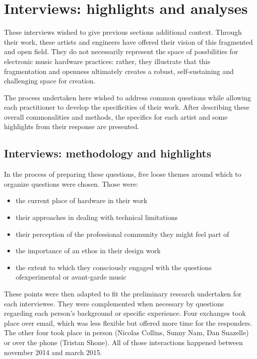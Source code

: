 \chapter{Interviews: highlights and analyses}\label{interviews}

These interviews wished to give previous sections additional context. Through their work, these artists and engineers have offered their vision of this fragmented and open field. They do not necessarily represent the space of possbilities for electronic music hardware practices: rather, they illustrate that this fragmentation and openness ultimately creates a robust, self-sustaining and challenging space for creation. 

The process undertaken here wished to address common questions while allowing each practitioner to develop the specificities of their work. After describing these overall commonalities and methods, the specifics for each artist and some highlights from their response are presented. 

\section{Interviews: methodology and highlights}

In the process of preparing these questions, five loose themes around which to organize questions were chosen. Those were: 

\begin{itemize}
	\item the current place of hardware in their work 
	\item their approaches in dealing with technical limitations
	\item their perception of the professional community they might feel part of
	\item the importance of an ethos in their design work
	\item the extent to which they consciously engaged with the questions ofexperimental or avant-garde music 
	\end{itemize}

These points were then adapted to fit the preliminary research undertaken for each interviewee. They were complemented when necessary by questions regarding each person's background or specific experience. Four exchanges took place over email, which was less flexible but offered more time for the responders. The other four took place in person (Nicolas Collins, Sunny Nam, Dan Snazelle) or over the phone (Tristan Shone). All of those interactions happened between november 2014 and march 2015. 

